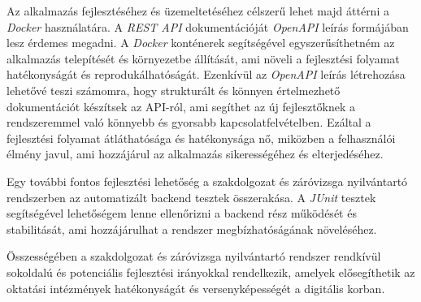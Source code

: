 Az alkalmazás fejlesztéséhez és üzemeltetéséhez célszerű lehet majd áttérni a \textit{Docker} használatára. A \textit{REST API} dokumentációját \textit{OpenAPI} leírás formájában lesz érdemes megadni. A \textit{Docker} konténerek segítségével egyszerűsíthetném az alkalmazás telepítését és környezetbe állítását, ami növeli a fejlesztési folyamat hatékonyságát és reprodukálhatóságát. Ezenkívül az \textit{OpenAPI} leírás létrehozása lehetővé teszi számomra, hogy strukturált és könnyen értelmezhető dokumentációt készítsek az API-ról, ami segíthet az új fejlesztőknek a rendszeremmel való könnyebb és gyorsabb kapcsolatfelvételben. Ezáltal a fejlesztési folyamat átláthatósága és hatékonysága nő, miközben a felhasználói élmény javul, ami hozzájárul az alkalmazás sikerességéhez és elterjedéséhez.

Egy további fontos fejlesztési lehetőség a szakdolgozat és záróvizsga nyilvántartó rendszerben az automatizált backend tesztek összerakása. A \textit{JUnit} tesztek segítségével lehetőségem lenne ellenőrizni a backend rész működését és stabilitását, ami hozzájárulhat a rendszer megbízhatóságának növeléséhez. 

Összességében a szakdolgozat és záróvizsga nyilvántartó rendszer rendkívül sokoldalú és potenciális fejlesztési irányokkal rendelkezik, amelyek elősegíthetik az oktatási intézmények hatékonyságát és versenyképességét a digitális korban.